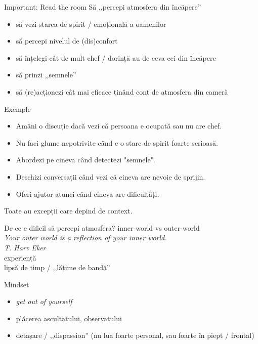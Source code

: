 \documentclass{simple}
\begin{document}
\begin{frame}{Important: Read the room}
  \pause Să ,,percepi atmosfera din încăpere''
  \begin{itemize}
    \pause \item să vezi starea de spirit / emoțională a oamenilor
    \pause \item să percepi nivelul de (dis)confort
    \pause \item să înțelegi cât de mult chef / dorință au de ceva cei din încăpere
    \pause \item să prinzi ,,semnele''
    \pause \item să (re)acționezi cât mai eficace ținând cont de atmosfera din cameră
  \end{itemize}
\end{frame}

\begin{frame}{Exemple}
  \begin{itemize}
    \item Amâni o discuție dacă vezi că persoana e ocupată sau nu are chef.
    \item Nu faci glume nepotrivite când e o stare de spirit foarte serioasă.
    \item Abordezi pe cineva când detectezi "semnele".
    \item Deschizi conversații când vezi că cineva are nevoie de sprijin.
    \item Oferi ajutor atunci când cineva are dificultăți.
  \end{itemize}
  \pause Toate au excepții care depind de context.
\end{frame}

\begin{frame}{De ce e dificil să percepi atmosfera?}
  \centering
  \pause
  \Large
  inner-world vs outer-world \\
  \pause
  \vspace{1cm}
  \textit{Your outer world is a reflection of your inner world.} \\
  \vspace{3mm}
  \hfill \textit{T. Harv Eker} \\
  \pause
  \vspace{1cm}
  experiență \\
  \pause
  \vspace{1cm}
  lipsă de timp / ,,lățime de bandă''
\end{frame}

\begin{frame}{Mindset}
  \begin{itemize}
    \pause \item \textit{get out of yourself}
    \pause \item plăcerea ascultatului, observatului
    \pause \item detașare / ,,dispassion'' (nu lua foarte personal, sau foarte în piept / frontal)
  \end{itemize}
\end{frame}
\end{document}
